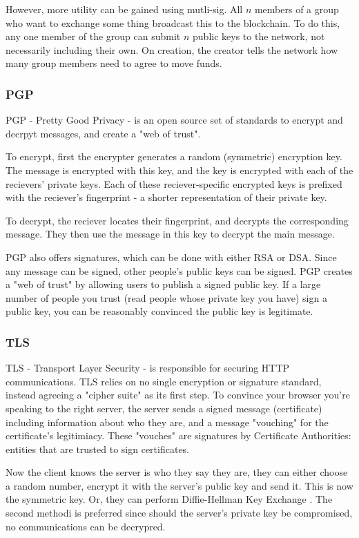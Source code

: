 \documentclass{article}
\begin{document}
However, more utility can be gained using mutli-sig.
All $n$ members of a group who want to exchange some thing broadcast this to the blockchain.
To do this, any one member of the group can submit $n$ public keys to the network, not necessarily including their own.
On creation, the creator tells the network how many group members need to agree to move funds.

\subsubsection{PGP}
PGP - Pretty Good Privacy - is an open source set of standards to
encrypt and decrpyt messages, and create a "web of trust".

To encrypt, first the encrypter generates a random (symmetric) encryption key.
The message is encrypted with this key,
and the key is encrypted with each of the recievers' private keys.
Each of these reciever-specific encrypted keys is prefixed with the
reciever's fingerprint - a shorter representation of their private key.

To decrypt, the reciever locates their fingerprint, and decrypts the corresponding message.
They then use the message in this key to decrypt the main message.

PGP also offers signatures, which can be done with either RSA or DSA.
Since any message can be signed, other people's public keys can be signed.
PGP creates a "web of trust" by allowing users to publish a signed public key.
If a large number of people you trust (read people whose private key you have)
sign a public key, you can be reasonably convinced the public key is legitimate.
\subsubsection{TLS}
TLS - Transport Layer Security - is responsible for securing HTTP communications.
TLS relies on no single encryption or signature standard, instead agreeing a "cipher suite" as its first step.
To convince your browser you're speaking to the right server,
the server sends a signed message (certificate) including information about who they are,
and a message "vouching" for the certificate's legitimiacy.
These "vouches" are signatures by Certificate Authorities: entities that are trusted to sign certificates.

Now the client knows the server is who they say they are,
they can either choose a random number, encrypt it with the server's public key and send it.
This is now the symmetric key.
Or, they can perform Diffie-Hellman Key Exchange \cite{Directions}.
The second methodi is preferred since should the server's private key be compromised,
no communications can be decrypred.
\newpage
\end{document}
